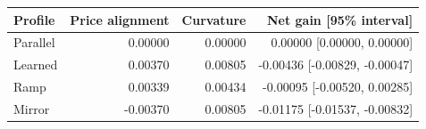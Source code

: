\begin{tabular}{lrrr}
\toprule
Profile & Price alignment & Curvature & Net gain [95\% interval] \\
\midrule
Parallel & 0.00000 & 0.00000 & 0.00000 [0.00000, 0.00000] \\
Learned & 0.00370 & 0.00805 & -0.00436 [-0.00829, -0.00047] \\
Ramp & 0.00339 & 0.00434 & -0.00095 [-0.00520, 0.00285] \\
Mirror & -0.00370 & 0.00805 & -0.01175 [-0.01537, -0.00832] \\
\bottomrule
\end{tabular}
